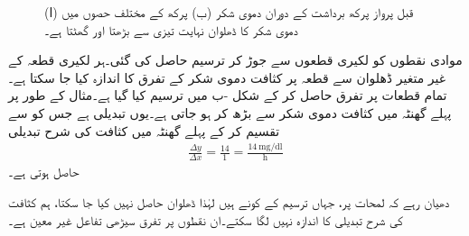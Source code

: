 \begin{figure}
\centering
\begin{subfigure}{0.5\textwidth}
\centering
{}
\caption{}
\end{subfigure}%
\begin{subfigure}{0.5\textwidth}
\centering
{}
\caption{}
\end{subfigure}%
\caption{(ا) قبل پرواز پرکھ برداشت کے دوران دموی شکر (ب)  پرکھ  کے مختلف حصوں میں  دموی شکر کا ڈھلوان نہایت تیزی سے بڑھتا اور گھٹتا  ہے۔}
\label{شکل_مثال_تفرق_پرواز}
\end{figure}
موادی نقطوں کو لکیری  قطعوں سے جوڑ کر ترسیم حاصل کی گئی۔ہر  لکیری قطعہ کے غیر متغیر ڈھلوان سے  قطعہ  پر کثافت دموی شکر کے تفرق کا اندازہ کیا جا سکتا ہے۔ تمام قطعات پر  تفرق  حاصل کر کے شکل -ب میں ترسیم کیا گیا ہے۔مثال کے طور پر پہلے گھنٹہ میں کثافت دموی شکر  سے بڑھ کر  ہو جاتی ہے۔یوں  تبدیلی   ہے جس کو  سے تقسیم کر کے پہلے گھنٹہ میں کثافت کی شرح تبدیلی  
\begin{align*}
\frac{\Delta y}{\Delta x}=\frac{14}{1}=\frac{\SI{14}{\milli\gram\per\deci\litre}}{\si{\hour}}
\end{align*}    
حاصل ہوتی ہے۔

دھیان رہے کہ لمحات  پر، جہاں ترسیم کے کونے  ہیں لہٰذا  ڈھلوان حاصل نہیں کیا جا سکتا، ہم کثافت کی شرح تبدیلی کا اندازہ نہیں لگا سکتے۔ان نقطوں پر تفرق سیڑھی تفاعل غیر معین ہے۔   


